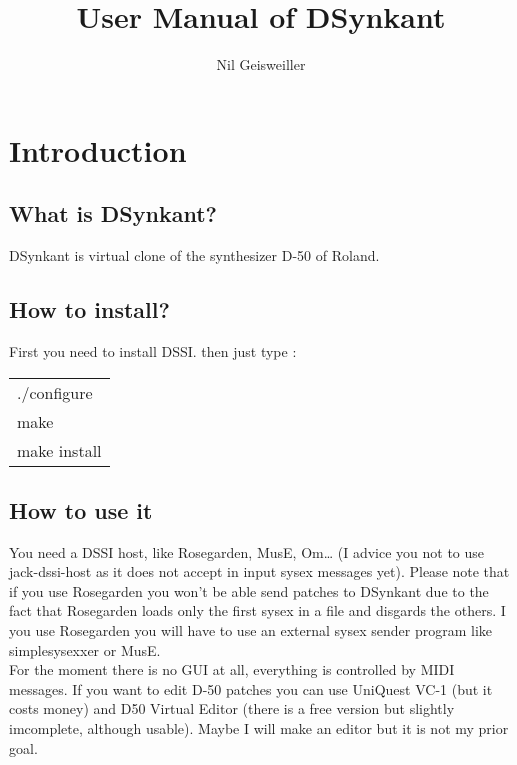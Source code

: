 \documentclass[11pt]{report}
\title{User Manual of DSynkant}
\author{Nil Geisweiller}
\begin{document}
\maketitle

\tableofcontents

\chapter{Introduction}

\section{What is DSynkant?}

DSynkant is virtual clone of the synthesizer D-50 of Roland.

\section{How to install?}

First you need to install DSSI. then just type :\\
\begin{tabular}{l}
./configure\\
make\\
make install
\end{tabular}

\section{How to use it}

You need a DSSI host, like Rosegarden, MusE, Om\dots
(I advice you not to use jack-dssi-host as it does not accept in input
sysex messages yet). Please note that if you use Rosegarden you won't be able
send patches to DSynkant due to the fact that
Rosegarden loads only the first sysex in a file and disgards the others.
I you use Rosegarden you will have to use an external sysex sender program
like simplesysexxer or MusE.\\

For the moment there is no GUI at all, everything is controlled by MIDI
messages. If you want to edit D-50 patches you can use UniQuest VC-1 (but it
costs money) and D50 Virtual Editor (there is a free version but slightly
imcomplete, although usable). Maybe I will make an editor but it is not
my prior goal.
\end{document}
